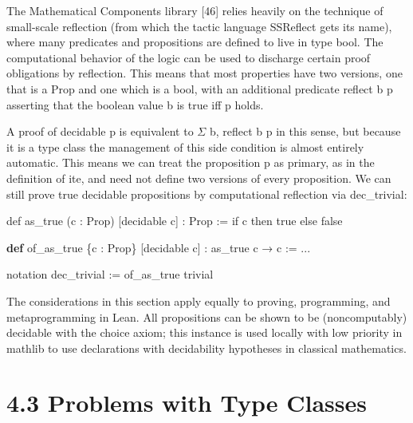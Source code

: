 \documentclass[
]{article}
\newenvironment{Shaded}{}{}
\newcommand{\KeywordTok}[1]{\textcolor[rgb]{0.00,0.44,0.13}{\textbf{#1}}}
\newcommand{\NormalTok}[1]{#1}
\newcommand{\OperatorTok}[1]{\textcolor[rgb]{0.40,0.40,0.40}{#1}}
\begin{document}
The Mathematical Components library {[}46{]} relies heavily on the
technique of small-scale reflection (from which the tactic language
SSReflect gets its name), where many predicates and propositions are
defined to live in type bool. The computational behavior of the logic
can be used to discharge certain proof obligations by reflection. This
means that most properties have two versions, one that is a Prop and one
which is a bool, with an additional predicate reflect b p asserting that
the boolean value b is true iff p holds.

A proof of decidable p is equivalent to \(\Sigma\) b, reflect b p in
this sense, but because it is a type class the management of this side
condition is almost entirely automatic. This means we can treat the
proposition p as primary, as in the definition of ite, and need not
define two versions of every proposition. We can still prove true
decidable propositions by computational reflection via dec\_trivial:

\begin{Shaded}
\begin{Highlighting}[]
\NormalTok{def as\_true (c : Prop) [decidable c] : Prop :=}
\NormalTok{if c then true else false }
\end{Highlighting}
\end{Shaded}

\begin{Shaded}
\begin{Highlighting}[]
\KeywordTok{def}\NormalTok{ of\_as\_true \{c : Prop\} [decidable c] :}
\NormalTok{    as\_true c → c }\OperatorTok{:=}\NormalTok{ ... }
\end{Highlighting}
\end{Shaded}

\begin{Shaded}
\begin{Highlighting}[]
\NormalTok{notation \textasciigrave{}dec\_trivial\textasciigrave{} := of\_as\_true trivial }
\end{Highlighting}
\end{Shaded}

The considerations in this section apply equally to proving,
programming, and metaprogramming in Lean. All propositions can be shown
to be (noncomputably) decidable with the choice axiom; this instance is
used locally with low priority in mathlib to use declarations with
decidability hypotheses in classical mathematics.

\section{4.3 Problems with Type
Classes}\label{problems-with-type-classes}
\end{document}
